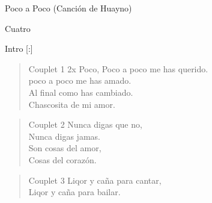 \begin{song}[huayno]{Poco a Poco (Canción de Huayno)}

\begin{instrumental}{Cuatro}
\measure{}\measure{}\measure*{}
\end{instrumental}

\begin{instrumental}{Intro}
\measure{}\measure{}\measure{}\measure{}
\measure{}\measure{}\measure{}\measure{}
\measure{}\measure{}\measure*{}[:]
\end{instrumental}

\begin{verse}{Couplet 1 2x}
Poco, Poco a poco me has querido.\\
poco a poco me has amado.\\
Al final como has cambiado.\\
Chascosita de mi amor.
\end{verse}

\begin{verse}{Couplet 2}
Nunca digas que no,\\
Nunca digas jamas.\\
Son cosas del amor,\\
Cosas del corazón.
\end{verse}

\begin{verse}{Couplet 3}
Liqor y caña para cantar,\\
Liqor y caña para bailar.
\end{verse}

\end{song}

